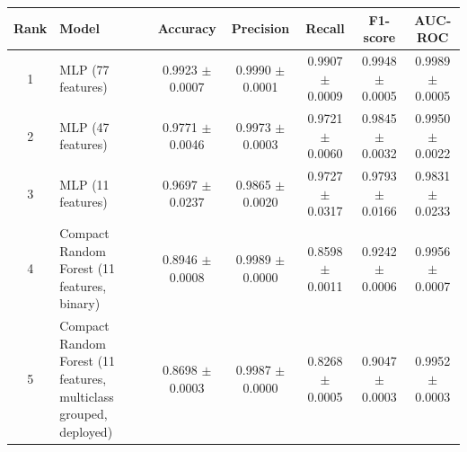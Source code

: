 \begin{tabular}{clccccc}
\toprule
\textbf{Rank} & \textbf{Model} & \textbf{Accuracy} & \textbf{Precision} & \textbf{Recall} & \textbf{F1-score} & \textbf{AUC-ROC}\\
\midrule
1 & MLP (77 features) & 0.9923 $\pm$ 0.0007 & 0.9990 $\pm$ 0.0001 & 0.9907 $\pm$ 0.0009 & 0.9948 $\pm$ 0.0005 & 0.9989 $\pm$ 0.0005\\
2 & MLP (47 features) & 0.9771 $\pm$ 0.0046 & 0.9973 $\pm$ 0.0003 & 0.9721 $\pm$ 0.0060 & 0.9845 $\pm$ 0.0032 & 0.9950 $\pm$ 0.0022\\
3 & MLP (11 features) & 0.9697 $\pm$ 0.0237 & 0.9865 $\pm$ 0.0020 & 0.9727 $\pm$ 0.0317 & 0.9793 $\pm$ 0.0166 & 0.9831 $\pm$ 0.0233\\
4 & Compact Random Forest (11 features, binary) & 0.8946 $\pm$ 0.0008 & 0.9989 $\pm$ 0.0000 & 0.8598 $\pm$ 0.0011 & 0.9242 $\pm$ 0.0006 & 0.9956 $\pm$ 0.0007\\
5 & Compact Random Forest (11 features, multiclass grouped, deployed) & 0.8698 $\pm$ 0.0003 & 0.9987 $\pm$ 0.0000 & 0.8268 $\pm$ 0.0005 & 0.9047 $\pm$ 0.0003 & 0.9952 $\pm$ 0.0003\\
\bottomrule
\end{tabular}
